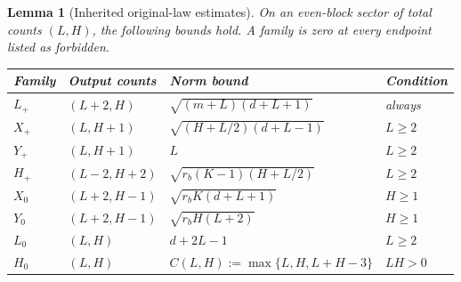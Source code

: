 \documentclass[11pt]{article}
\numberwithin{equation}{section}
\newtheorem{lemma}[theorem]{Lemma}
\theoremstyle{definition}\newtheorem{definition}[theorem]{Definition}
\theoremstyle{remark}\newtheorem{remark}[theorem]{Remark}
\begin{document}
\begin{lemma}[Inherited original-law estimates]
On an even-block sector of total counts $(L,H)$, the following bounds hold. A family is zero at every endpoint listed as forbidden.
\begin{center}\small
\renewcommand{\arraystretch}{1.22}
\begin{tabularx}{\linewidth}{@{}l l Y l@{}}
\toprule
Family & Output counts & Norm bound & Condition\\
\midrule
$L_+$ & $(L+2,H)$ & $\sqrt{(m+L)(d+L+1)}$ & always\\
$X_+$ & $(L,H+1)$ & $\sqrt{(H+L/2)(d+L-1)}$ & $L\ge2$\\
$Y_+$ & $(L,H+1)$ & $L$ & $L\ge2$\\
$H_+$ & $(L-2,H+2)$ & $\sqrt{r_b(K-1)(H+L/2)}$ & $L\ge2$\\
$X_0$ & $(L+2,H-1)$ & $\sqrt{r_bK(d+L+1)}$ & $H\ge1$\\
$Y_0$ & $(L+2,H-1)$ & $\sqrt{r_bH(L+2)}$ & $H\ge1$\\
$L_0$ & $(L,H)$ & $d+2L-1$ & $L\ge2$\\
$H_0$ & $(L,H)$ & $C(L,H):=\max\{L,H,L+H-3\}$ & $LH>0$\\
\bottomrule
\end{tabularx}
\end{center}
\label{lem:channels}
\end{lemma}
\end{document}
